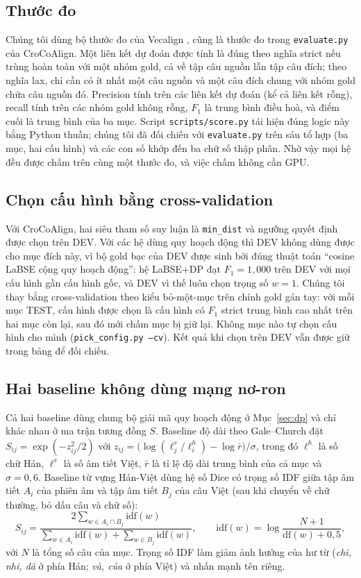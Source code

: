 \documentclass[11pt,a4paper]{article}
\newcommand{\code}[1]{\texttt{#1}}
\newcommand{\croco}{CroCoAlign}
\begin{document}
\subsection{Thước đo}
Chúng tôi dùng bộ thước đo của Vecalign \cite{vecalign}, cũng là thước đo trong \code{evaluate.py} của \croco{}. Một
liên kết dự đoán được tính là đúng theo nghĩa strict nếu trùng hoàn toàn với một nhóm gold, cả về tập câu nguồn lẫn tập
câu đích; theo nghĩa lax, chỉ cần có ít nhất một câu nguồn và một câu đích chung với nhóm gold chứa câu nguồn đó.
Precision tính trên các liên kết dự đoán (kể cả liên kết rỗng), recall tính trên các nhóm gold không rỗng, $F_1$ là
trung bình điều hoà, và điểm cuối là trung bình của ba mục. Script \code{scripts/score.py} tái hiện đúng logic này bằng
Python thuần; chúng tôi đã đối chiếu với \code{evaluate.py} trên sáu tổ hợp (ba mục, hai cấu hình) và các con số khớp
đến ba chữ số thập phân. Nhờ vậy mọi hệ đều được chấm trên cùng một thước đo, và việc chấm không cần GPU.

\subsection{Chọn cấu hình bằng cross-validation}\label{sec:cv}
Với \croco{}, hai siêu tham số suy luận là \code{min\_dist} và ngưỡng quyết định được chọn trên DEV. Với các hệ dùng
quy hoạch động thì DEV không dùng được cho mục đích này, vì bộ gold bạc của DEV được sinh bởi đúng thuật toán ``cosine
LaBSE cộng quy hoạch động'': hệ LaBSE+DP đạt $F_1=1{,}000$ trên DEV với mọi cấu hình gần cấu hình gốc, và DEV vì thế
luôn chọn trọng số $w=1$. Chúng tôi thay bằng cross-validation theo kiểu bỏ-một-mục trên chính gold gán tay: với mỗi
mục TEST, cấu hình được chọn là cấu hình có $F_1$ strict trung bình cao nhất trên hai mục còn lại, sau đó mới chấm mục
bị giữ lại. Không mục nào tự chọn cấu hình cho mình (\code{pick\_config.py --cv}). Kết quả khi chọn trên DEV vẫn được
giữ trong bảng để đối chiếu.

\subsection{Hai baseline không dùng mạng nơ-ron}\label{sec:baselines}
Cả hai baseline dùng chung bộ giải mã quy hoạch động ở Mục~\ref{sec:dp} và chỉ khác nhau ở ma trận tương đồng $S$.
Baseline độ dài theo Gale--Church đặt $S_{ij}=\exp(-z_{ij}^2/2)$ với
$z_{ij}=\big(\log(\ell^{v}_j/\ell^{h}_i)-\log\bar r\big)/\sigma$, trong đó $\ell^{h}$ là số chữ Hán, $\ell^{v}$ là số
âm tiết Việt, $\bar r$ là tỉ lệ độ dài trung bình của cả mục và $\sigma=0{,}6$. Baseline từ vựng Hán-Việt dùng hệ số
Dice có trọng số IDF giữa tập âm tiết $A_i$ của phiên âm và tập âm tiết $B_j$ của câu Việt (sau khi chuyển về chữ
thường, bỏ dấu câu và chữ số):
\[S_{ij}=\frac{2\sum_{w\in A_i\cap B_j}\mathrm{idf}(w)}{\sum_{w\in A_i}\mathrm{idf}(w)+\sum_{w\in B_j}\mathrm{idf}(w)},\qquad
\mathrm{idf}(w)=\log\frac{N+1}{\mathrm{df}(w)+0{,}5},\]
với $N$ là tổng số câu của mục. Trọng số IDF làm giảm ảnh hưởng của hư từ (\emph{chi, nhi, dã} ở phía Hán; \emph{và,
của} ở phía Việt) và nhấn mạnh tên riêng.
\end{document}
